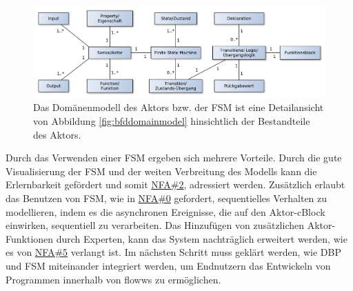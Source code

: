 \begin{figure}[h]
  \centering
  \includegraphics[width=1\textwidth]{bilder/chapter4/chapter4_2/domainmodellaktor.pdf}
  \caption{Das Domänenmodell des Aktors bzw. der \ac{FSM} ist eine Detailansicht von Abbildung \ref{fig:bfddomainmodel} hinsichtlich der Bestandteile des Aktors. }
  \label{fig:domainmodelfsm}
\end{figure} \hyperref[]{}

Durch das Verwenden einer \ac{FSM} ergeben sich mehrere Vorteile. Durch die gute Visualisierung der \ac{FSM} und der weiten Verbreitung des Modells kann die Erlernbarkeit gefördert und somit \hyperref[tab:NFA2]{NFA\#2}, adressiert werden. Zusätzlich erlaubt das Benutzen von \ac{FSM}, wie in  \hyperref[tab:NFA0]{NFA\#0} gefordert, sequentielles Verhalten zu modellieren, indem es die asynchronen Ereignisse, die auf den Aktor-cBlock einwirken, sequentiell zu verarbeiten. Das Hinzufügen von zusätzlichen Aktor-Funktionen durch Experten, kann das System nachträglich erweitert werden, wie es von  \hyperref[tab:NFA5]{NFA\#5} verlangt ist. Im nächsten Schritt muss geklärt werden, wie \ac{DBP} und \ac{FSM} miteinander integriert werden, um Endnutzern das Entwickeln von Programmen innerhalb von flowws zu ermöglichen.